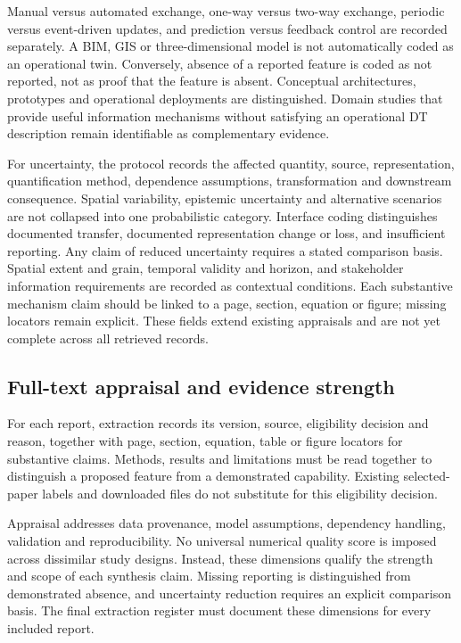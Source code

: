 Manual versus automated exchange, one-way versus two-way exchange, periodic versus event-driven updates, and prediction versus feedback control are recorded separately. A BIM, GIS or three-dimensional model is not automatically coded as an operational twin. Conversely, absence of a reported feature is coded as not reported, not as proof that the feature is absent. Conceptual architectures, prototypes and operational deployments are distinguished. Domain studies that provide useful information mechanisms without satisfying an operational DT description remain identifiable as complementary evidence.

For uncertainty, the protocol records the affected quantity, source, representation, quantification method, dependence assumptions, transformation and downstream consequence. Spatial variability, epistemic uncertainty and alternative scenarios are not collapsed into one probabilistic category. Interface coding distinguishes documented transfer, documented representation change or loss, and insufficient reporting. Any claim of reduced uncertainty requires a stated comparison basis. Spatial extent and grain, temporal validity and horizon, and stakeholder information requirements are recorded as contextual conditions. Each substantive mechanism claim should be linked to a page, section, equation or figure; missing locators remain explicit. These fields extend existing appraisals and are not yet complete across all retrieved records.

\subsection{Full-text appraisal and evidence strength}
For each report, extraction records its version, source, eligibility decision and reason, together with page, section, equation, table or figure locators for substantive claims. Methods, results and limitations must be read together to distinguish a proposed feature from a demonstrated capability. Existing selected-paper labels and downloaded files do not substitute for this eligibility decision.

Appraisal addresses data provenance, model assumptions, dependency handling, validation and reproducibility. No universal numerical quality score is imposed across dissimilar study designs. Instead, these dimensions qualify the strength and scope of each synthesis claim. Missing reporting is distinguished from demonstrated absence, and uncertainty reduction requires an explicit comparison basis. The final extraction register must document these dimensions for every included report.

